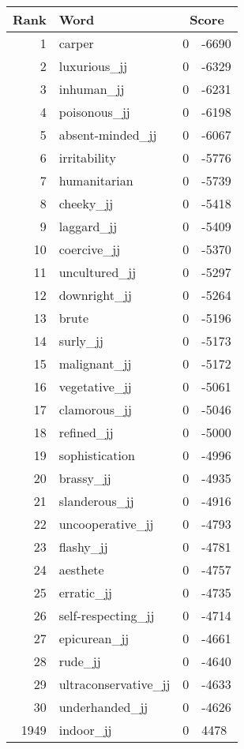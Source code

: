 \begin{longtable}[!htbp]{| rlr@{.}l |}
    \hline
    \textbf{Rank} & \textbf{Word} & \multicolumn{2}{c|}{\textbf{Score}} \\
    \hline
    \endhead
    1 & carper & 0 & -6690 \\
    2 & luxurious\_jj & 0 & -6329 \\
    3 & inhuman\_jj & 0 & -6231 \\
    4 & poisonous\_jj & 0 & -6198 \\
    5 & absent-minded\_jj & 0 & -6067 \\
    6 & irritability & 0 & -5776 \\
    7 & humanitarian & 0 & -5739 \\
    8 & cheeky\_jj & 0 & -5418 \\
    9 & laggard\_jj & 0 & -5409 \\
    10 & coercive\_jj & 0 & -5370 \\
    11 & uncultured\_jj & 0 & -5297 \\
    12 & downright\_jj & 0 & -5264 \\
    13 & brute & 0 & -5196 \\
    14 & surly\_jj & 0 & -5173 \\
    15 & malignant\_jj & 0 & -5172 \\
    16 & vegetative\_jj & 0 & -5061 \\
    17 & clamorous\_jj & 0 & -5046 \\
    18 & refined\_jj & 0 & -5000 \\
    19 & sophistication & 0 & -4996 \\
    20 & brassy\_jj & 0 & -4935 \\
    21 & slanderous\_jj & 0 & -4916 \\
    22 & uncooperative\_jj & 0 & -4793 \\
    23 & flashy\_jj & 0 & -4781 \\
    24 & aesthete & 0 & -4757 \\
    25 & erratic\_jj & 0 & -4735 \\
    26 & self-respecting\_jj & 0 & -4714 \\
    27 & epicurean\_jj & 0 & -4661 \\
    28 & rude\_jj & 0 & -4640 \\
    29 & ultraconservative\_jj & 0 & -4633 \\
    30 & underhanded\_jj & 0 & -4626 \\
    1949 & indoor\_jj & 0 & 4478 \\

\end{longtable}

